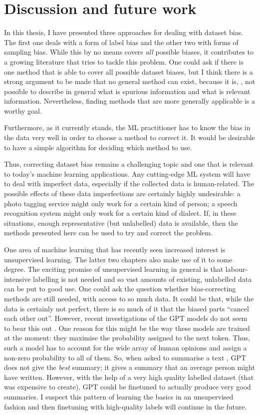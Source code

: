 \chapter{Discussion and future work}\label{ch:conclusion}
In this thesis, I have presented three approaches for dealing with dataset bias.
The first one deals with a form of label bias and the other two with forms of sampling bias.
While this by no means covers \emph{all} possible biases,
it contributes to a growing literature that tries to tackle this problem.
One could ask if there is one method that is able to cover all possible dataset biases,
but I think there is a strong argument to be made that no general method can exist,
because it is, \eg, not possible to describe in general what is spurious information and what is relevant information.
Nevertheless, finding methods that are more generally applicable is a worthy goal.

Furthermore, as it currently stands,
the \ac{ML} practitioner has to know the bias in the data very well in order to choose a method to correct it.
It would be desirable to have a simple algorithm for deciding which method to use.

Thus, correcting dataset bias remains a challenging topic
and one that is relevant to today's machine learning applications.
Any cutting-edge \ac{ML} system will have to deal with imperfect data,
especially if the collected data is human-related.
The possible effects of these data imperfections are certainly highly undesirable:
a photo tagging service might only work for a certain kind of person;
a speech recognition system might only work for a certain kind of dialect.
If, in these situations, enough representative (but unlabelled) data is available,
then the methods presented here can be used to try and correct the problem.

One area of machine learning that has recently seen increased interest is unsupervised learning.
The latter two chapters also make use of it to some degree.
The exciting promise of unsupervised learning in general is
that labour-intensive labelling is not needed and so vast amounts of existing, unlabelled data can be put to good use.
One could ask the question whether bias-correcting methods are still needed, with access to so much data.
It could be that, while the data is certainly not perfect,
there is so much of it that the biased parts ``cancel each other out''.
However, recent investigations of the GPT models do not seem to bear this out \citep{khalifa2021distributional}.
One reason for this might be the way these models are trained at the moment:
they maximise the probability assigned to the next token.
Thus, such a model has to account for the wide array of human opinions and assign a non-zero probability to all of them.
So, when asked to summarise a text \citep{stiennon2020learning}, GPT does not give the \emph{best} summary;
it gives a summary that an average person might have written.
However, with the help of a very high quality labelled dataset (that was expensive to create),
GPT could be finetuned to actually produce very good summaries.
I suspect this pattern of learning the basics in an unsupervised fashion
and then finetuning with high-quality labels will continue in the future.
